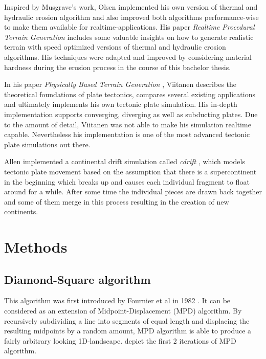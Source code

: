 \documentclass[11pt,a4paper,twoside,openright]{report}
\begin{document}
Inspired by Musgrave's work, Olsen implemented his own version of thermal and hydraulic erosion algorithm and also improved both algorithms performance-wise to make them available for realtime-applications. His paper \emph{Realtime Procedural Terrain Generation} \cite{Olsen:2004} includes some valuable insights on how to generate realistic terrain with speed optimized versions of thermal and hydraulic erosion algorithms. His techniques were adapted and improved by considering material hardness during the erosion process in the course of this bachelor thesis.

In his paper \emph{Physically Based Terrain Generation} \cite{Viitanen:2012}, Viitanen describes the theoretical foundations of plate tectonics, compares several existing applications and ultimately implements his own tectonic plate simulation. His in-depth implementation supports converging, diverging as well as subducting plates. Due to the amount of detail, Viitanen was not able to make his simulation realtime capable. Nevertheless his implementation is one of the most advanced tectonic plate simulations out there.

Allen implemented a continental drift simulation called \emph{cdrift} \cite{Allen:1991}, which models tectonic plate movement based on the assumption that there is a supercontinent in the beginning which breaks up and causes each individual fragment to float around for a while. After some time the individual pieces are drawn back together and some of them merge in this process resulting in the creation of new continents.
\chapter{Methods}
\label{sec:methods}

\section{Diamond-Square algorithm}
This algorithm was first introduced by Fournier et al in 1982 \cite{Fournier:1982:CRS:358523.358553}. It can be considered as an extension of Midpoint-Displacement (MPD) algorithm. By recursively subdividing a line into segments of equal length and displacing the resulting midpoints by a random amount, MPD algorithm is able to produce a fairly arbitrary looking 1D-landscape.  depict the first 2 iterations of MPD algorithm.
\end{document}
